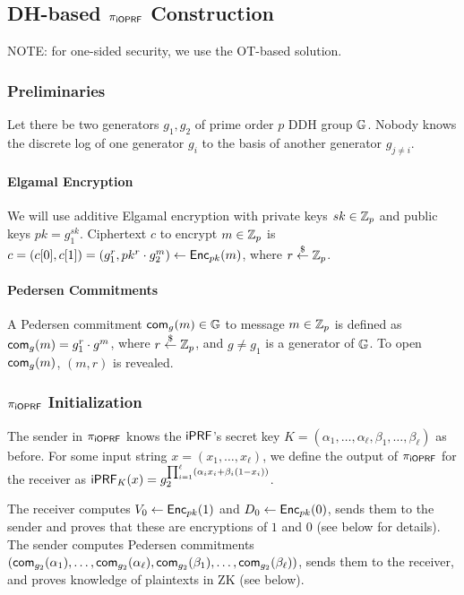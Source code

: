 \subsection{DH-based ${\pi_{\mathsf{i}\mathsf{OPRF}}}$ Construction}
NOTE: for one-sided security, we use the OT-based solution.


\subsubsection{Preliminaries}
Let there be two generators $g_1,g_2$ of prime order $p$ DDH group
$\mathbb{G}$. Nobody knows the discrete log of one generator $g_i$ to the
basis of another generator $g_{j\neq{}i}$.

\paragraph{Elgamal Encryption}
We will use additive Elgamal encryption with private keys $sk\in\mathbb{Z}_p$
and public keys $pk=g_1^{sk}$. Ciphertext $c$ to encrypt $m\in\mathbb{Z}_p$ is
$c=(c[0],c[1])=(g_1^r,pk^r\cdot{}g_2^m)\leftarrow{\mathsf{Enc}}_{pk}(m)$, where
$r\stackrel{\$}{\leftarrow}\mathbb{Z}_p$.

\paragraph{Pedersen Commitments}
A Pedersen commitment $\mathsf{com}_{g}(m)\in\mathbb{G}$ to message $m\in\mathbb{Z}_p$ is defined as
$\mathsf{com}_{g}(m)=g_1^r\cdot{}g^m$, where $r\stackrel{\$}{\leftarrow}\mathbb{Z}_p$, and $g\neq{}g_1$ is
a generator of $\mathbb{G}$.  To open $\mathsf{com}_{g}(m)$, $(m,r)$ is revealed.


\subsubsection{${\pi_{\mathsf{i}\mathsf{OPRF}}}$ Initialization}
The sender in ${\pi_{\mathsf{i}\mathsf{OPRF}}}$ knows the $\mathsf{i}\mathsf{PRF}$'s secret key
$K=(\alpha_1,\ldots,\alpha_\ell,\beta_1,\ldots,\beta_\ell)$ as before. For some input
string $x=(x_1,\ldots{},x_\ell)$, we define the output of ${\pi_{\mathsf{i}\mathsf{OPRF}}}$ for
the receiver as
$\mathsf{i}\mathsf{PRF}_K(x)=g_2^{\prod_{i=1}^{\ell}(\alpha_ix_i+\beta_i(1-x_i))}$.

The receiver computes $V_0 \leftarrow{\mathsf{Enc}}_{pk}(1)$ and
$D_0\leftarrow{\mathsf{Enc}}_{pk}(0)$, sends them to the sender and proves that
these are encryptions of $1$ and $0$ (see below for details). The
sender computes Pedersen commitments
$(\mathsf{com}_{g_2}(\alpha_1),\ldots,\mathsf{com}_{g_2}(\alpha_\ell),\mathsf{com}_{g_2}(\beta_1),\ldots,\mathsf{com}_{g_2}(\beta_\ell))$,
sends them to the receiver, and proves knowledge of plaintexts in ZK
(see below).

